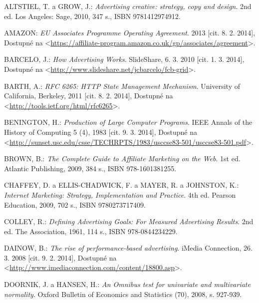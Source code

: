 \documentclass[12pt,twoside,openany]{fithesis}
\begin{document}

\begin{thebibliography}{99}



ALTSTIEL, T. a GROW, J.: \emph{Advertising creative: strategy, copy and design}. 2nd ed. Los Angeles: Sage, 2010, 347 s., ISBN 9781412974912.

AMAZON: \emph{EU Associates Programme Operating Agreement}. 2013 [cit. 8. 2. 2014], Dostupné na {\textless}\url{https://affiliate-program.amazon.co.uk/gp/associates/agreement}{\textgreater}.

BARCELO, J.: \emph{How Advertising Works}. SlideShare, 6. 3. 2010 [cit. 1. 3. 2014], Dostupné na {\textless}\url{http://www.slideshare.net/jcbarcelo/fcb-grid}{\textgreater}.

BARTH, A.: \emph{RFC 6265: HTTP State Management Mechanism}. University of California, Berkeley, 2011 [cit. 8. 2. 2014], Dostupné na {\textless}\url{http://tools.ietf.org/html/rfc6265}{\textgreater}.

BENINGTON, H.: \emph{Production of Large Computer Programs}. IEEE Annals of the History of Computing 5
        (4), 1983 [cit. 9. 3. 2014], Dostupné na {\textless}\url{http://sunset.usc.edu/csse/TECHRPTS/1983/usccse83-501/usccse83-501.pdf}{\textgreater}.

BROWN, B.: \emph{The Complete Guide to Affiliate Marketing on the Web}. 1st ed. Atlantic Publishing, 2009, 384 s., ISBN 978-1601381255.

CHAFFEY, D. a ELLIS-CHADWICK, F. a MAYER, R. a JOHNSTON, K.: \emph{Internet Marketing: Strategy, Implementation and Practice}. 4th ed. Pearson Education, 2009, 702 s., ISBN 9780273717409.

COLLEY, R.: \emph{Defining Advertising Goals: For Measured Advertising Results}. 2nd ed. The Association, 1961, 114 s., ISBN 978-0844234229.

DAINOW, B.: \emph{The rise of performance-based advertising}. iMedia Connection, 26. 3. 2008 [cit. 9. 2. 2014], Dostupné na {\textless}\url{http://www.imediaconnection.com/content/18800.asp}{\textgreater}.

DOORNIK, J. a HANSEN, H.: \emph{An Omnibus test for univariate and multivariate normality}.
Oxford Bulletin of Economics and Statistics (70), 2008, s. 927-939.


\end{thebibliography}
\end{document}
